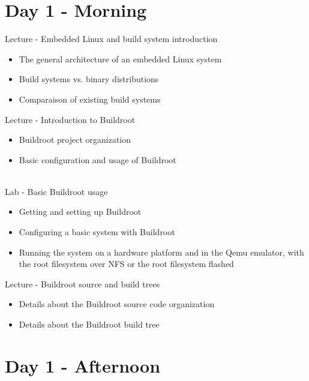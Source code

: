\documentclass[a4paper,12pt,obeyspaces,spaces,hyphens]{article}
\begin{document}
\section{Day 1 - Morning}

\feagendatwocolumn
{Lecture - Embedded Linux and build system introduction}
{
  \begin{itemize}
  \item The general architecture of an embedded Linux system
  \item Build systems vs. binary distributions
  \item Comparaison of existing build systems
  \end{itemize}
}
{Lecture - Introduction to Buildroot}
{
  \begin{itemize}
  \item Buildroot project organization
  \item Basic configuration and usage of Buildroot
  \end{itemize}
}
\\
\feagendatwocolumn
{Lab - Basic Buildroot usage}
{
  \begin{itemize}
  \item Getting and setting up Buildroot
  \item Configuring a basic system with Buildroot
  \item Running the system on a hardware platform and in the Qemu
    emulator, with the root filesystem over NFS or the root filesystem
    flashed
  \end{itemize}
}
{Lecture - Buildroot source and build trees}
{
  \begin{itemize}
  \item Details about the Buildroot source code organization
  \item Details about the Buildroot build tree
  \end{itemize}
}

\section{Day 1 - Afternoon}
\end{document}
